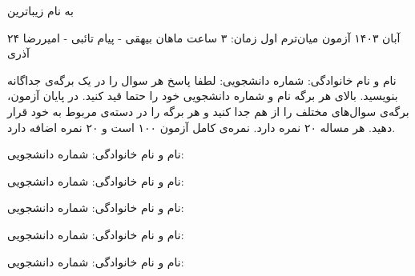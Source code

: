 
\usepackage{assets/template}
\newcommand{\hidesolutions}{}


{\centering به نام زیباترین}\\
	\def\ci{\perp\!\!\!\perp}

	\header
		{۲۴ آبان ۱۴۰۳}
		{آزمون میان‌ترم اول}
		{زمان: ۳ ساعت}
		{ماهان بیهقی - پیام تائبی - امیررضا آذری}{}
	
\vspace{-3mm}
نام و نام خانوادگی: \hspace{8cm} شماره دانشجویی:
\hline
\vspace{2mm}
لطفا پاسخ هر سوال را در یک برگه‌ی جداگانه بنویسید. بالای هر برگه نام و شماره‌ دانشجویی خود را حتما قید کنید. در پایان آزمون، برگه‌ی سوال‌های مختلف را از هم جدا کنید و هر برگه را در دسته‌ی مربوط به خود قرار دهید.
هر مساله ۲۰ نمره دارد. نمره‌ی کامل آزمون ۱۰۰ است و  ۲۰ نمره اضافه دارد.

\vspace{0.5cm}

\pagebreak
\hline
نام و نام خانوادگی: \hspace{8cm} شماره دانشجویی:
\hline
\vspace{0.5cm}

\pagebreak
\hline
نام و نام خانوادگی: \hspace{8cm} شماره دانشجویی:
\hline
\vspace{0.5cm}

\pagebreak
\hline
نام و نام خانوادگی: \hspace{8cm} شماره دانشجویی:
\hline
\vspace{0.5cm}

\pagebreak
\hline
نام و نام خانوادگی: \hspace{8cm} شماره دانشجویی:
\hline
\vspace{0.5cm}

\pagebreak
\hline
نام و نام خانوادگی: \hspace{8cm} شماره دانشجویی:
\hline
\vspace{0.5cm}


